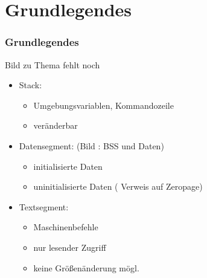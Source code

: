 \documentclass[ddcfooter]{tudbeamer}
\begin{document}
\section{Grundlegendes}
\begin{frame} 
    \frametitle{Grundlegendes}
    
    Bild zu Thema fehlt noch\\
    
    \begin{itemize}
    	\item Stack: 
		\begin{itemize}
			\item Umgebungsvariablen, Kommandozeile
			\item veränderbar
		\end{itemize}
	\item Datensegment: (Bild : BSS und Daten) 
		\begin{itemize}
			\item initialisierte Daten    
			\item uninitialisierte Daten ( Verweis auf Zeropage)
		\end{itemize}
	\item Textsegment: 
		\begin{itemize}
			\item Maschinenbefehle
			\item nur lesender Zugriff
			\item keine Größenänderung mögl. 
		\end{itemize}
    \end{itemize}
   

\end{frame}
\end{document}

